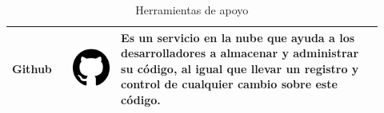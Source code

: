 \begin{table}[h!]
\begin{center}
\begin{tabular}{ m{0.15\linewidth} m{0.12\linewidth} m{0.65\linewidth} }
Github & 
\includegraphics[height=0.122\textwidth]{figures/GitHub.png} & 
Es un servicio en la nube que ayuda a los desarrolladores a almacenar y administrar su código, al igual que llevar un registro y control de cualquier cambio sobre este código.
\\ 
\hline

\end{tabular}
\caption{Herramientas de apoyo}
\end{center}
\end{table}
